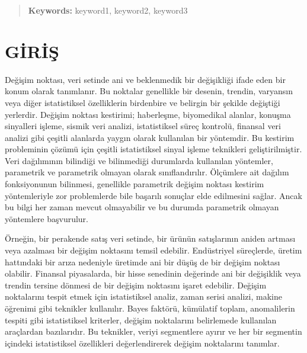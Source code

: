 \documentclass[12pt,twoside]{deuthesis}
\begin{document}
\begin{abstract}
	\textbf{Keywords:} keyword1, keyword2, keyword3
\end{abstract}


  \hypersetup{linkcolor=black}
  \setcounter{tocdepth}{2}
  \tableofcontents

  \listoftables

  \listoffigures


\newlength{\cslhangindent}
\setlength{\cslhangindent}{1.5em}
\newenvironment{CSLReferences}%
  {}%
  {\par}
\newenvironment{cslreferences}%
  {}%
  {\par}

\mainmatter %
\pagestyle{fancyplain} %

\hypertarget{giriux15f}{%
\chapter*{GİRİŞ}\label{giriux15f}}

Değişim noktası, veri setinde ani ve beklenmedik bir değişikliği ifade eden bir konum olarak tanımlanır. Bu noktalar genellikle bir desenin, trendin, varyansın veya diğer istatistiksel özelliklerin birdenbire ve belirgin bir şekilde değiştiği yerlerdir. Değişim noktası kestirimi; haberleşme, biyomedikal alanlar, konuşma sinyalleri işleme, sismik veri analizi, istatistiksel süreç kontrolü, finansal veri analizi gibi çeşitli alanlarda yaygın olarak kullanılan bir yöntemdir. Bu kestirim probleminin çözümü için çeşitli istatistiksel sinyal işleme teknikleri geliştirilmiştir. Veri dağılımının bilindiği ve bilinmediği durumlarda kullanılan yöntemler, parametrik ve parametrik olmayan olarak sınıflandırılır. Ölçümlere ait dağılım fonksiyonunun bilinmesi, genellikle parametrik değişim noktası kestirim yöntemleriyle zor problemlerde bile başarılı sonuçlar elde edilmesini sağlar. Ancak bu bilgi her zaman mevcut olmayabilir ve bu durumda parametrik olmayan yöntemlere başvurulur.

Örneğin, bir perakende satış veri setinde, bir ürünün satışlarının aniden artması veya azalması bir değişim noktasını temsil edebilir. Endüstriyel süreçlerde, üretim hattındaki bir arıza nedeniyle üretimde ani bir düşüş de bir değişim noktası olabilir. Finansal piyasalarda, bir hisse senedinin değerinde ani bir değişiklik veya trendin tersine dönmesi de bir değişim noktasını işaret edebilir. Değişim noktalarını tespit etmek için istatistiksel analiz, zaman serisi analizi, makine öğrenimi gibi teknikler kullanılır. Bayes faktörü, kümülatif toplam, anomalilerin tespiti gibi istatistiksel kriterler, değişim noktalarını belirlemede kullanılan araçlardan bazılarıdır. Bu teknikler, veriyi segmentlere ayırır ve her bir segmentin içindeki istatistiksel özellikleri değerlendirerek değişim noktalarını tanımlar.
\end{document}
